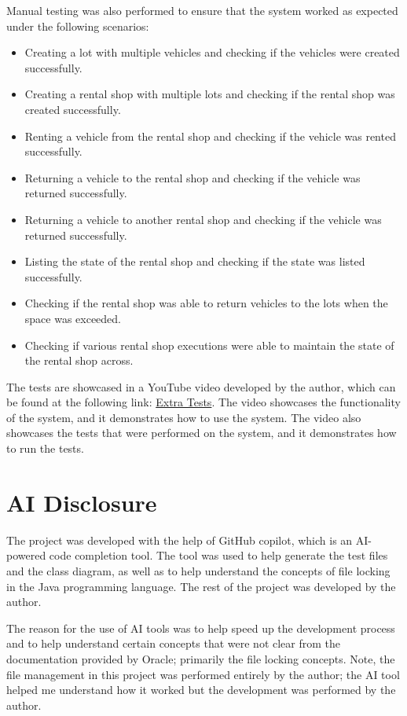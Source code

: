 \documentclass[conference]{IEEEtran}
\begin{document}
Manual testing was also performed to ensure that the system worked as expected under the following scenarios: 
\begin{itemize}
    \item Creating a lot with multiple vehicles and checking if the vehicles were created successfully.
    \item Creating a rental shop with multiple lots and checking if the rental shop was created successfully.
    \item Renting a vehicle from the rental shop and checking if the vehicle was rented successfully.
    \item Returning a vehicle to the rental shop and checking if the vehicle was returned successfully.
    \item Returning a vehicle to another rental shop and checking if the vehicle was returned successfully.
    \item Listing the state of the rental shop and checking if the state was listed successfully.
    \item Checking if the rental shop was able to return vehicles to the lots when the space was exceeded.
    \item Checking if various rental shop executions were able to maintain the state of the rental shop across.
\end{itemize}

The tests are showcased in a YouTube video developed by the author, which can be found at the following link: \href{https://youtu.be/x1P02jSwtFk}{Extra Tests}. The video showcases the functionality of the system, and it demonstrates how to use the system. The video also showcases the tests that were performed on the system, and it demonstrates how to run the tests.

\section{AI Disclosure}
The project was developed with the help of GitHub copilot, which is an AI-powered code completion tool. The tool was used to help generate the test files and the class diagram, as well as to help understand the concepts of file locking in the Java programming language. The rest of the project was developed by the author. 

The reason for the use of AI tools was to help speed up the development process and to help understand certain concepts that were not clear from the documentation provided by Oracle; primarily the file locking concepts. Note, the file management in this project was performed entirely by the author; the AI tool helped me understand how it worked but the development was performed by the author. 
\end{document}
